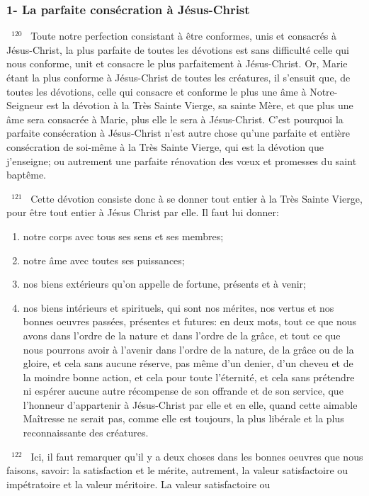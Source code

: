 \documentclass[paper=a5,pagesize=pdftex,fontsize=15pt,headinclude=on,twoside=off]{scrbook}
\newcommand{\negphantom}[1]{\settowidth{\dimen0}{#1}\hspace*{-\dimen0}}
\newcommand{\versenb}[1]{\par \vspace{10pt}~\negphantom{~${}^{#1}$~}${}^{#1}$~}
\begin{document}
\subsubsection{1- La parfaite consécration à Jésus-Christ}
\versenb{120} Toute notre perfection consistant à être conformes, unis et consacrés à Jésus-Christ, la plus parfaite de
toutes les dévotions est sans difficulté celle qui nous conforme, unit et consacre le plus parfaitement à Jésus-Christ. Or, Marie étant la plus conforme à Jésus-Christ de toutes les créatures, il s'ensuit que, de toutes les dévotions,
celle qui consacre et conforme le plus une âme à Notre-Seigneur est la dévotion à la Très Sainte Vierge, sa sainte
Mère, et que plus une âme sera consacrée à Marie, plus elle le sera à Jésus-Christ.
C'est pourquoi la parfaite consécration à Jésus-Christ n'est autre chose qu'une parfaite et entière consécration de
soi-même à la Très Sainte Vierge, qui est la dévotion que j'enseigne; ou autrement une parfaite rénovation des
vœux et promesses du saint baptême.
\versenb{121} Cette dévotion consiste donc à se donner tout entier à la Très Sainte Vierge, pour être tout entier à Jésus Christ par elle. Il faut lui donner:
\begin{enumerate}[label=\arabic*°]
  \item notre corps avec tous ses sens et ses membres;
  \item notre âme avec toutes ses puissances;
  \item nos biens extérieurs qu'on appelle de fortune, présents et à venir;
  \item nos biens intérieurs et spirituels, qui sont nos mérites, nos vertus et nos bonnes oeuvres passées, présentes et futures: en deux mots, tout ce que nous avons dans l'ordre de la nature et dans l'ordre de la grâce, et tout ce que nous pourrons avoir à
l'avenir dans l'ordre de la nature, de la grâce ou de la gloire, et cela sans aucune réserve, pas même d'un denier,
d'un cheveu et de la moindre bonne action, et cela pour toute l'éternité, et cela sans prétendre ni espérer aucune
autre récompense de son offrande et de son service, que l'honneur d'appartenir à Jésus-Christ par elle et en elle,
quand cette aimable Maîtresse ne serait pas, comme elle est toujours, la plus libérale et la plus reconnaissante
 des créatures.
\end{enumerate}
\versenb{122} Ici, il faut remarquer qu'il y a deux choses dans les bonnes oeuvres que nous faisons, savoir: la satisfaction
et le mérite, autrement, la valeur satisfactoire ou impétratoire et la valeur méritoire. La valeur satisfactoire ou
\end{document}
